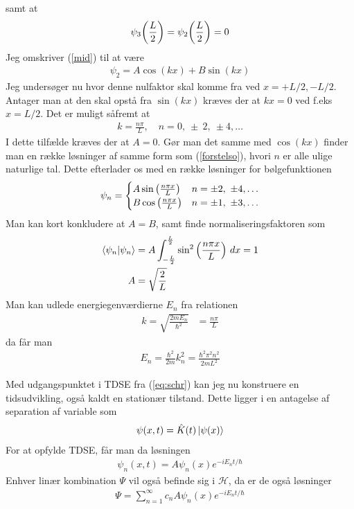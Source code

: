 \documentclass[12pt]{article}
\theoremstyle{definition}
\theoremstyle{remark}
\theoremstyle{definition}
\numberwithin{equation}{section}
\begin{document}
samt at
\begin{align}
    \psi_3\qty(\frac{L}{2})=\psi_2\qty(\frac{L}{2})=0
\end{align}
Jeg omskriver (\ref{mid}) til at være
\begin{align}
    \psi_2 = A\cos(kx)+B\sin(kx)
\end{align}
Jeg undersøger nu hvor denne nulfaktor skal komme fra ved $x=+L/2,-L/2$. Antager man at den skal opstå fra $\sin(kx)$ kræves der at $kx=0$ ved f.eks $x=L/2$. Det er muligt såfremt at 
\begin{align}
\label{forstelso}
    k=\frac{n\pi}{L},\quad n=0,~\pm~2,~\pm 4,\dots
\end{align} I dette tilfælde kræves der at $A=0$. Gør man det samme med $\cos(kx)$ finder man en række løsninger af samme form som (\ref{forstelso}), hvori $n$ er alle ulige naturlige tal. Dette efterlader os med en række løsninger for bølgefunktionen
\begin{align}
    \psi_n = \begin{cases}
    A\sin\qty(\frac{n\pi x}{L}) & n=\pm2,~\pm 4,\dots \\
    B\cos\qty(\frac{n\pi x}{L}) & n=\pm1,~\pm 3,\dots
    \end{cases}
\end{align}
Man kan kort konkludere at $A=B$, samt finde normaliseringsfaktoren som
\begin{align}
\begin{split}
    \braket{\psi_n}{\psi_n} &= A \int_{-\frac{L}{2}}^{\frac{L}{2}} \sin^2\qty(\frac{n\pi x}{L})~dx=1 \\
    A &= \sqrt{\frac{2}{L}}
\end{split}
\end{align}
Man kan udlede energiegenværdierne $E_n$ fra relationen
\begin{align}
    k = \sqrt{\frac{2mE_n}{\hbar^2}} &= \frac{n\pi}{L}
\end{align}
da får man
\begin{align}
    E_n = \frac{\hbar^2}{2m}k^2_n = \frac{\hbar^2\pi^2n^2}{2mL^2}
\end{align}

Med udgangspunktet i TDSE fra (\ref{eq:schr}) kan jeg nu konstruere en tidsudvikling, også kaldt en stationær tilstand. Dette ligger i en antagelse af separation af variable som
\begin{align}
    \psi(x,t) = \hat K(t) \ket{\psi(x)}
\end{align}
For at opfylde TDSE, får man da løsningen
\begin{align}
    \psi_n(x,t) = A\psi_n(x)e^{-iE_nt/\hbar}
\end{align}
Enhver linær kombination $\Psi$ vil også befinde sig i $\mathcal H$, da er de også løsninger
\begin{align}
    \Psi = \sum_{n=1}^\infty c_nA\psi_n(x)e^{-iE_nt/\hbar}
\end{align}
\end{document}
